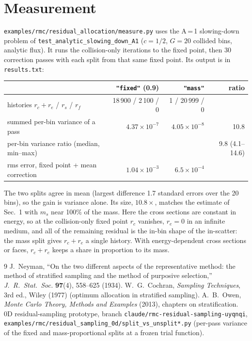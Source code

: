 \documentclass[11pt]{article}
\begin{document}
\section{Measurement}

\texttt{examples/rmc/residual\_allocation/measure.py} uses the A\,=\,1 slowing-down
problem of \texttt{test\_analytic\_slowing\_down\_A1} ($c=1/2$, $G=20$ collided bins,
analytic flux). It runs the collision-only iterations to the fixed point, then 30
correction passes with each split from that same fixed point. Its output is in
\texttt{results.txt}:

\begin{center}
\begin{tabular}{lrrr}
\toprule
 & \texttt{"fixed"} (0.9) & \texttt{"mass"} & ratio \\
\midrule
histories $r_c+r_e$ / $r_s$ / $r_f$ & 18\,900 / 2\,100 / 0 & 1 / 20\,999 / 0 & \\
summed per-bin variance of a pass & $4.37\times10^{-7}$ & $4.05\times10^{-8}$ & 10.8 \\
per-bin variance ratio (median, min--max) & & & 9.8 (4.1--14.6) \\
rms error, fixed point + mean correction & $1.04\times10^{-3}$ & $6.5\times10^{-4}$ & \\
\bottomrule
\end{tabular}
\end{center}
\noindent The two splits agree in mean (largest difference 1.7 standard errors over the
20 bins), so the gain is variance alone. Its size, $10.8\times$, matches the estimate
of Sec.~1 with $m_s$ near 100\% of the mass. Here the cross sections are constant in
energy, so at the collision-only fixed point $r_c$ vanishes, $r_e = 0$ in an infinite
medium, and all of the remaining residual is the in-bin shape of the in-scatter: the
mass split gives $r_c+r_e$ a single history. With energy-dependent cross sections or
faces, $r_c+r_e$ keeps a share in proportion to its mass.

\begin{thebibliography}{9}
 J.~Neyman, ``On the two different aspects of the representative
  method: the method of stratified sampling and the method of purposive selection,''
  \emph{J.\ R.\ Stat.\ Soc.} \textbf{97}(4), 558--625 (1934).
 W.~G.~Cochran, \emph{Sampling Techniques}, 3rd ed., Wiley (1977)
  (optimum allocation in stratified sampling).
 A.~B.~Owen, \emph{Monte Carlo Theory, Methods and Examples} (2013),
  chapters on stratification.
 0D residual-sampling prototype, branch
  \texttt{claude/rmc-residual-sampling-uyqnqi},
  \texttt{examples/rmc/residual\_sampling\_0d/split\_vs\_unsplit*.py} (per-pass
  variance of the fixed and mass-proportional splits at a frozen trial function).
\end{thebibliography}
\end{document}
